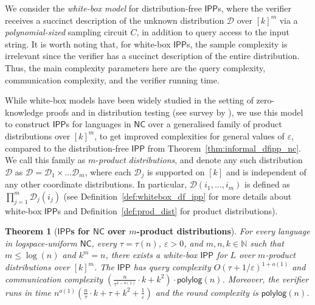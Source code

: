 \documentclass[11pt]{article}
\newtheorem{theorem}{Theorem}[section]
\newcommand{\polylog}{\mathsf{polylog}}
\newcommand{\NC}{\mathsf{NC}}
\newcommand{\IPP}{\mathsf{IPP}}
\newcommand{\N}{\mathbb{N}}
\newcommand{\sD}{\mathcal{D}}
\newcommand{\eps}{\varepsilon}
\begin{document}
We consider the \textit{white-box model} for distribution-free $\IPP$s, where the verifier receives a succinct description of the unknown distribution $\sD$ over $[k]^m$ via a \textit{polynomial-sized} sampling circuit $C$, in addition to query access to the input string. It is worth noting that, for white-box $\IPP$s, the sample complexity is irrelevant since the verifier has a succinct description of the entire distribution. Thus, the main complexity parameters here are the query complexity, communication complexity, and the verifier running time. 

While white-box models have been widely studied in the setting of zero-knowledge proofs \cite{SV97,vadhan_thesis,vadhan06_czk} and in distribution testing (see survey by \cite{GV11_survey}), we use this model to construct $\IPP$s for languages in $\NC$ over a generalised family of product distributions over $[k]^m$, to get improved complexities for general values of $\eps$, compared to the distribution-free $\IPP$ from Theorem~\ref{thm:informal_dfipp_nc}. We call this family as $m$-\textit{product distributions}, and denote any such distribution $\sD$ as $\sD = \sD_1 \times \dots \sD_m$, where each $\sD_j$ is supported on $[k]$ and is independent of any other coordinate distributions. In particular, $\sD(i_1, \dots, i_m)$ is defined as $\prod_{j=1}^m \sD_j(i_j)$ (see Definition~\ref{def:whitebox_df_ipp} for more details about white-box $\IPP$s  and Definition~\ref{def:prod_dist} for product distributions).

\begin{theorem}[\textbf{$\IPP$s for $\NC$ over $m$-product distributions}]
    \label{thm:informal_product_dfipp}
    For every language in logspace-uniform $\NC$, every $\tau=\tau(n)$, $\eps >0$, and $m,n,k \in \N$ such that $m \leq \log(n)$ and $k^m = n$, there exists a white-box $\IPP$ for $L$ over $m$-product distributions over $[k]^m$. The $\IPP$ has query complexity $O(\tau+ 1/\eps)^{1+o(1)}$ and communication complexity $\left(\frac{n}{\tau^{1-o(1)}} \cdot k+k^{2}\right) \cdot \polylog(n)$. Moreover, the verifier runs in time $n^{o(1)}\left(\frac{n}{\tau}\cdot k + \tau + k^2 + \frac{1}{\eps}\right)$ and the round complexity is $\polylog(n)$. 
\end{theorem}
\end{document}
